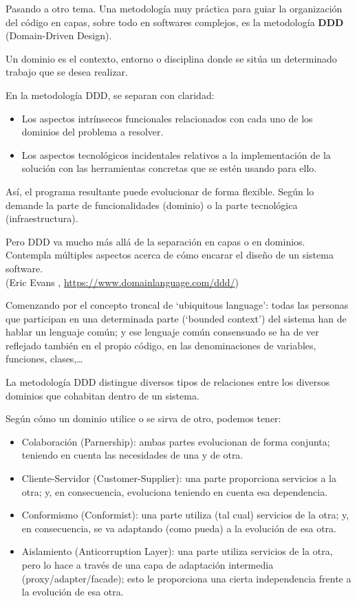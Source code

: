 \documentclass[spanish,12pt,a4paper,final,oneside]{book}
\begin{document}
\vspace{1.5cm}
Pasando a otro tema. Una metodología muy práctica para guiar la organización del código en capas, sobre todo en softwares complejos, es la metodología \textbf{DDD} (Domain-Driven Design).

Un dominio es el contexto, entorno o disciplina donde se sitúa un determinado trabajo que se desea realizar. 

En la metodología DDD, se separan con claridad:
\begin{itemize}
\item Los aspectos intrínsecos funcionales relacionados con cada uno de los dominios del problema a resolver. 
\item Los aspectos tecnológicos incidentales relativos a la implementación de la solución con las herramientas concretas que se estén usando para ello.
\end{itemize}

\vspace{0.2cm}
Así, el programa resultante puede evolucionar de forma flexible. Según lo demande la parte de funcionalidades (dominio) o la parte tecnológica (infraestructura).

Pero DDD va mucho más allá de la separación en capas o en dominios. Contempla múltiples aspectos acerca de cómo encarar el diseño de un sistema software. 
\\(Eric Evans , \url{https://www.domainlanguage.com/ddd/})

Comenzando por el concepto troncal de `ubiquitous language': todas las personas que participan en una determinada parte (`bounded context') del sistema han de hablar un lenguaje común; y ese lenguaje común consensuado se ha de ver reflejado también en el propio código, en las denominaciones de variables, funciones, clases,\ldots


\vspace{0.5cm}
La metodología DDD distingue diversos tipos de relaciones entre los diversos dominios que cohabitan dentro de un sistema.

Según cómo un dominio utilice o se sirva de otro, podemos tener:
\begin{itemize}

\item Colaboración (Parnership): ambas partes evolucionan de forma conjunta; teniendo en cuenta las necesidades de una y de otra.

\item Cliente-Servidor (Customer-Supplier): una parte proporciona servicios a la otra; y, en consecuencia, evoluciona teniendo en cuenta esa dependencia.

\item Conformismo (Conformist): una parte utiliza (tal cual) servicios de la otra; y, en consecuencia, se va adaptando (como pueda) a la evolución de esa otra.

\item Aislamiento (Anticorruption Layer): una parte utiliza servicios de la otra, pero lo hace a través de una capa de adaptación intermedia (proxy/adapter/facade); esto le proporciona una cierta independencia frente a la evolución de esa otra.

\end{itemize}
\end{document}
